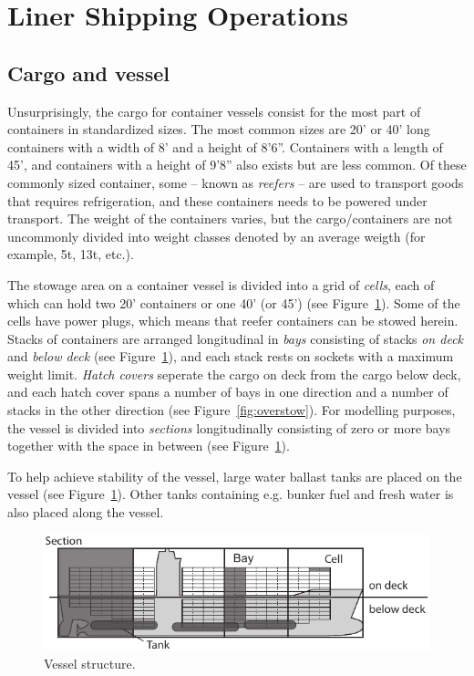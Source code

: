 \section{Liner Shipping Operations}
\subsection{Cargo and vessel}
Unsurprisingly, the cargo for container vessels consist for the most part of containers in standardized sizes. The most common sizes are 20' or 40' long containers with a width of 8' and a height of 8'6''. Containers with a length of 45', and containers with a height of 9'8'' also exists but are less common. Of these commonly sized container, some -- known as \emph{reefers} -- are used to transport goods that requires refrigeration, and these containers needs to be powered under transport.  The weight of the containers varies, but the cargo/containers are not uncommonly divided into weight classes denoted by an average weigth (for example, 5t, 13t, etc.).

The stowage area on a container vessel is divided into a grid of \emph{cells}, each of which can hold two 20' containers or one 40' (or 45') (see Figure~\ref{fig:vessel}). Some of the cells have power plugs, which means that reefer containers can be stowed herein. 
Stacks of containers are arranged longitudinal in \emph{bays} consisting of stacks \emph{on deck} and \emph{below deck} (see Figure~\ref{fig:vessel}), and each stack rests on sockets with a maximum weight limit. 
\emph{Hatch covers} seperate the cargo on deck from the cargo below deck, and each hatch cover spans a number of bays in one direction and a number of stacks in the other direction (see Figure~\ref{fig:overstow}).
For modelling purposes, the vessel is divided into \emph{sections} longitudinally consisting of zero or more bays together with the space in between (see Figure~\ref{fig:vessel}). 

To help achieve stability of the vessel, large water ballast tanks are placed on the vessel (see Figure~\ref{fig:vessel}). Other tanks containing e.g. bunker fuel and fresh water is also placed along the vessel.

\begin{figure}
	\centering
		\includegraphics{figures/vessel1.pdf} %
	\caption{Vessel structure.}
	\label{fig:vessel}
\end{figure}

